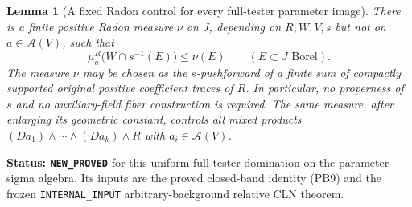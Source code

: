 \documentclass[11pt,a4paper]{article}
\numberwithin{equation}{section}
\newtheorem{lemma}[theorem]{Lemma}
\theoremstyle{definition}
\theoremstyle{remark}
\begin{document}
\begin{lemma}[A fixed Radon control for every full-tester parameter image]
\label{lem:r12-band-uniform-Radon-control}
There is a finite positive Radon measure $\nu$ on $J$, depending
on $R,W,V,s$ but not on $a\in\mathcal A(V)$, such that
\[
 \mu^R_a\bigl(W\cap s^{-1}(E)\bigr)\leq\nu(E)
                      \qquad(E\subset J\text{ Borel}).
 \tag{CB4}
\]
The measure $\nu$ may be chosen as the $s$-pushforward of a finite
sum of compactly supported original positive coefficient traces
of $R$. In particular, no properness of $s$ and no auxiliary-field
fiber construction is required. The same measure, after enlarging
its geometric constant, controls all mixed products
$(Da_1)\wedge\cdots\wedge(Da_k)\wedge R$ with
$a_i\in\mathcal A(V)$.
\end{lemma}

\noindent\textbf{Status: \texttt{NEW\_PROVED}} for this uniform
full-tester domination on the parameter sigma algebra. Its inputs
are the proved closed-band identity (PB9) and the frozen
\texttt{INTERNAL\_INPUT} arbitrary-background relative CLN theorem.
\end{document}
